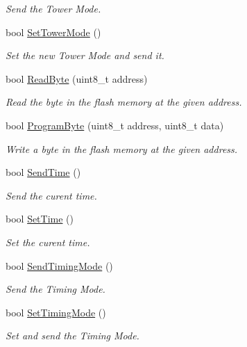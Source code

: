\begin{DoxyCompactItemize}
\begin{DoxyCompactList}\small\item\em Send the Tower Mode. \end{DoxyCompactList}\item 
bool \hyperlink{group___s_c_p__module_gab486e85eb7b3460ddd55676e0f56abb0}{Set\+Tower\+Mode} ()
\begin{DoxyCompactList}\small\item\em Set the new Tower Mode and send it. \end{DoxyCompactList}\item 
bool \hyperlink{group___s_c_p__module_ga24195e0e379030d35021f9ec93829da3}{Read\+Byte} (uint8\+\_\+t address)
\begin{DoxyCompactList}\small\item\em Read the byte in the flash memory at the given address. \end{DoxyCompactList}\item 
bool \hyperlink{group___s_c_p__module_gabe70b58ed934f2c3f907f0f2dfd36c0a}{Program\+Byte} (uint8\+\_\+t address, uint8\+\_\+t data)
\begin{DoxyCompactList}\small\item\em Write a byte in the flash memory at the given address. \end{DoxyCompactList}\item 
bool \hyperlink{group___s_c_p__module_gae39df37fd0f630802e9cda681d75e8f1}{Send\+Time} ()
\begin{DoxyCompactList}\small\item\em Send the curent time. \end{DoxyCompactList}\item 
bool \hyperlink{group___s_c_p__module_ga063fcccd9bdf53ff2ab9466909a29d4b}{Set\+Time} ()
\begin{DoxyCompactList}\small\item\em Set the curent time. \end{DoxyCompactList}\item 
bool \hyperlink{group___s_c_p__module_ga6060eac950a51b240f85d8be45ebed6a}{Send\+Timing\+Mode} ()
\begin{DoxyCompactList}\small\item\em Send the Timing Mode. \end{DoxyCompactList}\item 
bool \hyperlink{group___s_c_p__module_ga0d5baebea20182b8c9f9e355e3be0f82}{Set\+Timing\+Mode} ()
\begin{DoxyCompactList}\small\item\em Set and send the Timing Mode. \end{DoxyCompactList}\item 

\end{DoxyCompactItemize}
